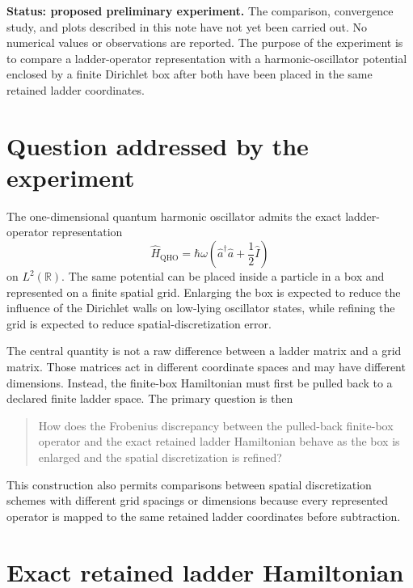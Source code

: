 
\textbf{Status: proposed preliminary experiment.} The comparison, convergence
study, and plots described in this note have not yet been carried out. No
numerical values or observations are reported. The purpose of the experiment is
to compare a ladder-operator representation with a harmonic-oscillator
potential enclosed by a finite Dirichlet box after both have been placed in the
same retained ladder coordinates.

\section*{Question addressed by the experiment}

The one-dimensional quantum harmonic oscillator admits the exact
ladder-operator representation
\begin{equation}
    \hat H_{\mathrm{QHO}}
    =
    \hbar\omega
    \left(
        \hat a^\dagger\hat a+\frac{1}{2}\hat I
    \right)
\end{equation}
on $L^2(\mathbb R)$. The same potential can be placed inside a particle in a
box and represented on a finite spatial grid. Enlarging the box is expected to
reduce the influence of the Dirichlet walls on low-lying oscillator states,
while refining the grid is expected to reduce spatial-discretization error.

The central quantity is not a raw difference between a ladder matrix and a grid
matrix. Those matrices act in different coordinate spaces and may have
different dimensions. Instead, the finite-box Hamiltonian must first be pulled
back to a declared finite ladder space. The primary question is then
\begin{quote}
How does the Frobenius discrepancy between the pulled-back finite-box operator
and the exact retained ladder Hamiltonian behave as the box is enlarged and the
spatial discretization is refined?
\end{quote}

This construction also permits comparisons between spatial discretization
schemes with different grid spacings or dimensions because every represented
operator is mapped to the same retained ladder coordinates before subtraction.

\section*{Exact retained ladder Hamiltonian}

